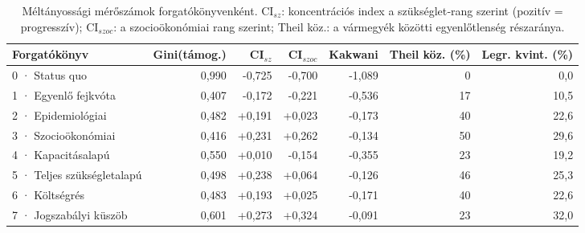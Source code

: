 \begin{table}[htbp]
\centering
\small
\begin{tabular}{p{3.5cm}rrrrrr}
\toprule
Forgatókönyv & Gini(támog.) & CI$_{sz}$ & CI$_{szoc}$ & Kakwani & Theil köz. (\%) & Legr. kvint. (\%) \\
\midrule
0 · Status quo & 0{,}990 & -0{,}725 & -0{,}700 & -1{,}089 & 0 & 0{,}0 \\
1 · Egyenlő fejkvóta & 0{,}407 & -0{,}172 & -0{,}221 & -0{,}536 & 17 & 10{,}5 \\
2 · Epidemiológiai & 0{,}482 & +0{,}191 & +0{,}023 & -0{,}173 & 40 & 22{,}6 \\
3 · Szocioökonómiai & 0{,}416 & +0{,}231 & +0{,}262 & -0{,}134 & 50 & 29{,}6 \\
4 · Kapacitásalapú & 0{,}550 & +0{,}010 & -0{,}154 & -0{,}355 & 23 & 19{,}2 \\
5 · Teljes szükségletalapú & 0{,}498 & +0{,}238 & +0{,}064 & -0{,}126 & 46 & 25{,}3 \\
6 · Költségrés & 0{,}483 & +0{,}193 & +0{,}025 & -0{,}171 & 40 & 22{,}6 \\
7 · Jogszabályi küszöb & 0{,}601 & +0{,}273 & +0{,}324 & -0{,}091 & 23 & 32{,}0 \\
\bottomrule
\end{tabular}
\caption{Méltányossági mérőszámok forgatókönyvenként. CI$_{sz}$: koncentrációs index a szükséglet‑rang szerint (pozitív = progresszív); CI$_{szoc}$: a szocioökonómiai rang szerint; Theil köz.: a vármegyék közötti egyenlőtlenség részaránya.}
\label{tab:equity}
\end{table}
